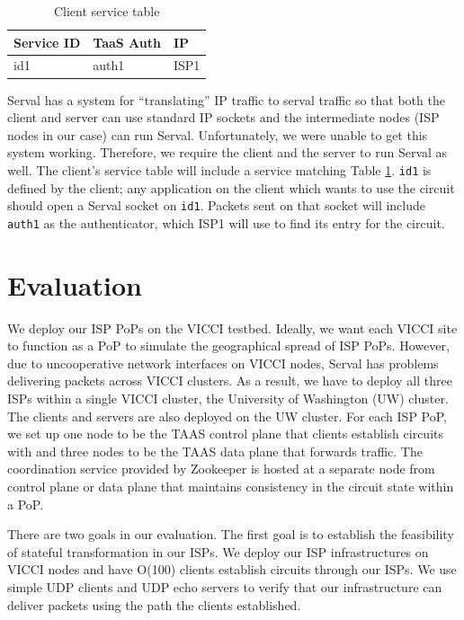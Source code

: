 \documentclass{article}
\begin{document}
\begin{table}
\centering
\begin{tabular}{| l | l | l | }
  \hline
  Service ID & TaaS Auth & IP \\ \hline
  id1 & auth1 & ISP1 \\ \hline
\end{tabular}
\caption{Client service table}
\label{table:clientservice}
\end{table}

Serval has a system for ``translating'' IP traffic to serval traffic
so that both the client and server can use standard IP sockets and the
intermediate nodes (ISP nodes in our case) can run
Serval. Unfortunately, we were unable to get this system
working. Therefore, we require the client and the server to run Serval
as well. The client's service table will include a service matching
Table \ref{table:clientservice}. \texttt{id1} is defined by the
client; any application on the client which wants to use the circuit
should open a Serval socket on \texttt{id1}. Packets sent on that
socket will include \texttt{auth1} as the authenticator, which ISP1
will use to find its entry for the circuit.

\section{Evaluation}

We deploy our ISP PoPs on the VICCI testbed.
Ideally, we want each VICCI site to function
as a PoP to simulate the geographical spread of ISP PoPs.
However, due to uncooperative network interfaces on VICCI nodes,
Serval has problems delivering packets across VICCI clusters.
As a result, we have to deploy all three ISPs within a single VICCI cluster,
 the University of Washington (UW) cluster. The clients and servers are also deployed
 on the UW cluster.
For each ISP PoP, we set up
one node to be the TAAS control plane that clients establish circuits with
and three nodes to be the TAAS data plane that forwards
traffic. The coordination service provided by Zookeeper is hosted
at a separate node from control plane or data plane that maintains consistency
in the circuit state within a PoP.

There are two goals in our evaluation. The first goal is to establish
the feasibility of stateful transformation in our ISPs. We 
deploy our ISP infrastructures on VICCI nodes and have O(100)
clients establish circuits through our ISPs. We use simple UDP clients
and UDP echo servers to verify that our infrastructure can deliver packets
using the path the clients established. 
\end{document}
